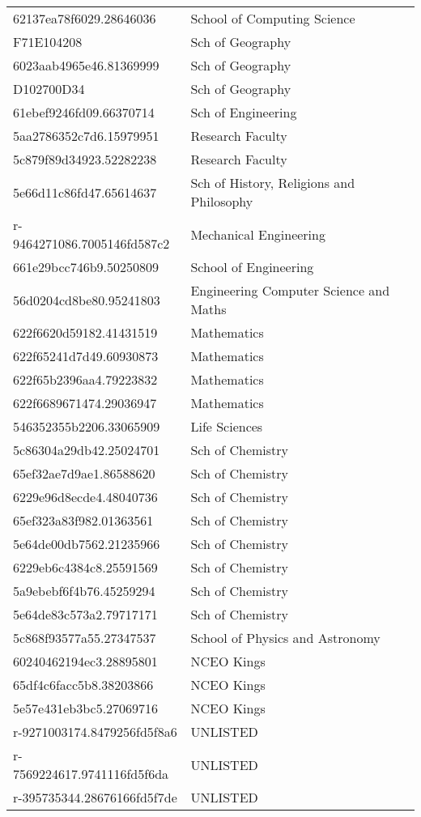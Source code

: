 \begin{tabular}{ll}
62137ea78f6029.28646036 & School of Computing Science \\
F71E104208 & Sch of Geography \\
6023aab4965e46.81369999 & Sch of Geography \\
D102700D34 & Sch of Geography \\
61ebef9246fd09.66370714 & Sch of Engineering \\
5aa2786352c7d6.15979951 & Research Faculty \\
5c879f89d34923.52282238 & Research Faculty \\
5e66d11c86fd47.65614637 & Sch of History, Religions and Philosophy \\
r-9464271086.7005146fd587c2 & Mechanical Engineering \\
661e29bcc746b9.50250809 & School of Engineering \\
56d0204cd8be80.95241803 & Engineering Computer Science and Maths \\
622f6620d59182.41431519 & Mathematics \\
622f65241d7d49.60930873 & Mathematics \\
622f65b2396aa4.79223832 & Mathematics \\
622f6689671474.29036947 & Mathematics \\
546352355b2206.33065909 & Life Sciences \\
5c86304a29db42.25024701 & Sch of Chemistry \\
65ef32ae7d9ae1.86588620 & Sch of Chemistry \\
6229e96d8ecde4.48040736 & Sch of Chemistry \\
65ef323a83f982.01363561 & Sch of Chemistry \\
5e64de00db7562.21235966 & Sch of Chemistry \\
6229eb6c4384c8.25591569 & Sch of Chemistry \\
5a9ebebf6f4b76.45259294 & Sch of Chemistry \\
5e64de83c573a2.79717171 & Sch of Chemistry \\
5c868f93577a55.27347537 & School of Physics and Astronomy \\
60240462194ec3.28895801 & NCEO Kings \\
65df4c6facc5b8.38203866 & NCEO Kings \\
5e57e431eb3bc5.27069716 & NCEO Kings \\
r-9271003174.8479256fd5f8a6 & UNLISTED \\
r-7569224617.9741116fd5f6da & UNLISTED \\
r-395735344.28676166fd5f7de & UNLISTED \\

\end{tabular}
